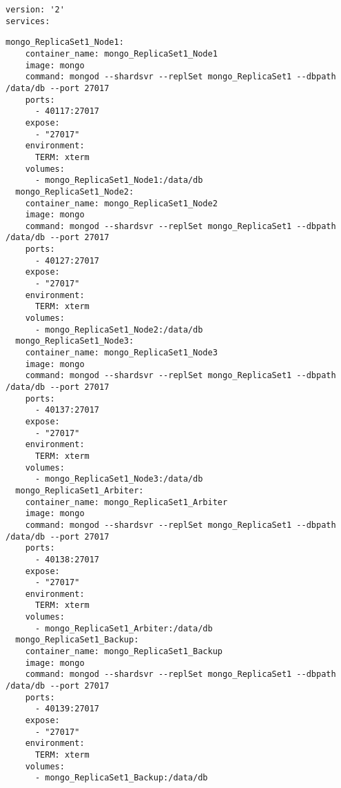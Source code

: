 
\begin{lstlisting}[caption=Docker Compose Nodes Version]
version: '2'
services:
\end{lstlisting}

\begin{lstlisting}[caption=Docker Compose Nodes for replica set 1]
mongo_ReplicaSet1_Node1:
    container_name: mongo_ReplicaSet1_Node1
    image: mongo
    command: mongod --shardsvr --replSet mongo_ReplicaSet1 --dbpath /data/db --port 27017
    ports:
      - 40117:27017
    expose:
      - "27017"
    environment:
      TERM: xterm
    volumes:
      - mongo_ReplicaSet1_Node1:/data/db
  mongo_ReplicaSet1_Node2:
    container_name: mongo_ReplicaSet1_Node2
    image: mongo
    command: mongod --shardsvr --replSet mongo_ReplicaSet1 --dbpath /data/db --port 27017
    ports:
      - 40127:27017
    expose:
      - "27017"
    environment:
      TERM: xterm
    volumes:
      - mongo_ReplicaSet1_Node2:/data/db
  mongo_ReplicaSet1_Node3:
    container_name: mongo_ReplicaSet1_Node3
    image: mongo
    command: mongod --shardsvr --replSet mongo_ReplicaSet1 --dbpath /data/db --port 27017
    ports:
      - 40137:27017
    expose:
      - "27017"
    environment:
      TERM: xterm
    volumes:
      - mongo_ReplicaSet1_Node3:/data/db
  mongo_ReplicaSet1_Arbiter:
    container_name: mongo_ReplicaSet1_Arbiter
    image: mongo
    command: mongod --shardsvr --replSet mongo_ReplicaSet1 --dbpath /data/db --port 27017
    ports:
      - 40138:27017
    expose:
      - "27017"
    environment:
      TERM: xterm
    volumes:
      - mongo_ReplicaSet1_Arbiter:/data/db
  mongo_ReplicaSet1_Backup:
    container_name: mongo_ReplicaSet1_Backup
    image: mongo
    command: mongod --shardsvr --replSet mongo_ReplicaSet1 --dbpath /data/db --port 27017
    ports:
      - 40139:27017
    expose:
      - "27017"
    environment:
      TERM: xterm
    volumes:
      - mongo_ReplicaSet1_Backup:/data/db
\end{lstlisting}

